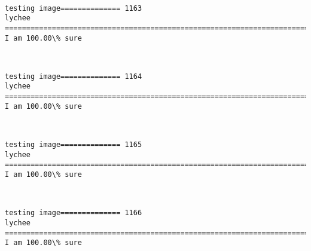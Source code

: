 \documentclass[11pt]{article}
\begin{document}
    \begin{center}
    \end{center}
    { \hspace*{\fill} \\}
    
    \begin{Verbatim}[commandchars=\\\{\}]
testing image============== 1163
lychee
============================================================================
I am 100.00\% sure

    \end{Verbatim}

    \begin{center}
    \end{center}
    { \hspace*{\fill} \\}
    
    \begin{Verbatim}[commandchars=\\\{\}]
testing image============== 1164
lychee
============================================================================
I am 100.00\% sure

    \end{Verbatim}

    \begin{center}
    \end{center}
    { \hspace*{\fill} \\}
    
    \begin{Verbatim}[commandchars=\\\{\}]
testing image============== 1165
lychee
============================================================================
I am 100.00\% sure

    \end{Verbatim}

    \begin{center}
    \end{center}
    { \hspace*{\fill} \\}
    
    \begin{Verbatim}[commandchars=\\\{\}]
testing image============== 1166
lychee
============================================================================
I am 100.00\% sure

    \end{Verbatim}
\end{document}
